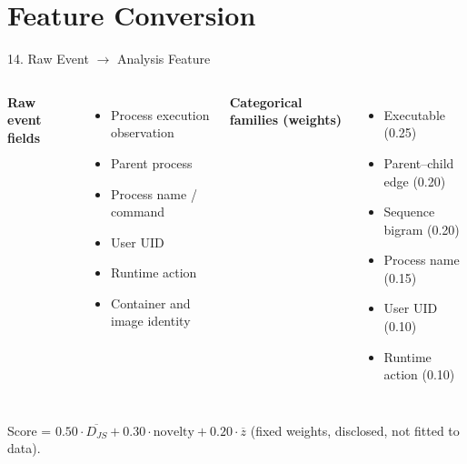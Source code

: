 \documentclass[aspectratio=169, 11pt]{beamer}
\begin{document}
\section{Feature Conversion}
\begin{frame}{14. Raw Event $\to$ Analysis Feature}
    \footnotesize
    \begin{columns}[T]
        \textbf{Raw event fields}
        \begin{itemize}\setlength\itemsep{2pt}
            \item Process execution observation
            \item Parent process
            \item Process name / command
            \item User UID
            \item Runtime action
            \item Container and image identity
        \end{itemize}
        \textbf{Categorical families (weights)}
        \begin{itemize}\setlength\itemsep{2pt}
            \item Executable (0.25)
            \item Parent--child edge (0.20)
            \item Sequence bigram (0.20)
            \item Process name (0.15)
            \item User UID (0.10)
            \item Runtime action (0.10)
        \end{itemize}
    \end{columns}
    \vspace{0.2cm}
    \centering
    \vspace{0.15cm}
    \footnotesize Score = $0.50\!\cdot\!\overline{D_{JS}} + 0.30\!\cdot\!\text{novelty} + 0.20\!\cdot\!\overline{z}$
    \quad(fixed weights, disclosed, not fitted to data).
\end{frame}
\end{document}
